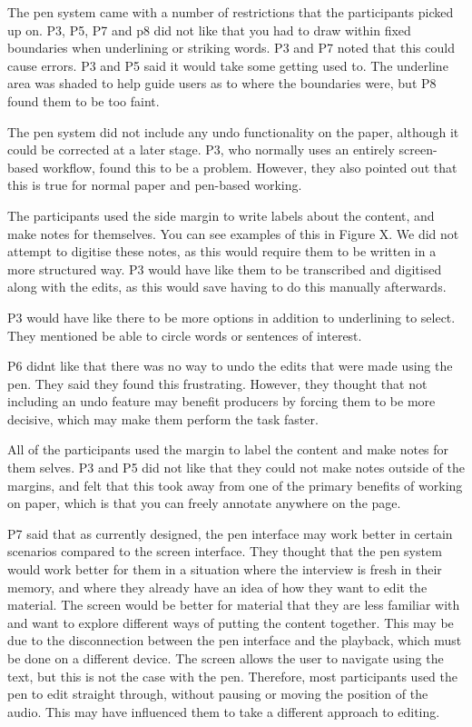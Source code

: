 The pen system came with a number of restrictions that the participants picked up on. P3, P5, P7 and p8 did not like
that you had to draw within fixed boundaries when underlining or striking words. P3 and P7 noted that this could cause
errors. P3 and P5 said it would take some getting used to. The underline area was shaded to help guide users as to
where the boundaries were, but P8 found them to be too faint.

The pen system did not include any undo functionality on the paper, although it could be corrected at a later stage.
P3, who normally uses an entirely screen-based workflow, found this to be a problem. However, they also pointed out
that this is true for normal paper and pen-based working.

The participants used the side margin to write labels about the content, and make notes for themselves. You can see
examples of this in Figure X. We did not attempt to digitise these notes, as this would require them to be written in a
more structured way. P3 would have like them to be transcribed and digitised along with the edits, as this would save
having to do this manually afterwards.

P3 would have like there to be more options in addition to underlining to select. They mentioned be able to circle
words or sentences of interest.

P6 didnt like that there was no way to undo the edits that were made using the pen. They said they found this
frustrating. However, they thought that not including an undo feature may benefit producers by forcing them to be more
decisive, which may make them perform the task faster.

All of the participants used the margin to label the content and make notes for them selves. P3 and P5 did not like
that they could not make notes outside of the margins, and felt that this took away from one of the primary benefits of
working on paper, which is that you can freely annotate anywhere on the page.

P7 said that as currently designed, the pen interface may work better in certain scenarios compared to the screen
interface. They thought that the pen system would work better for them in a situation where the interview is fresh in
their memory, and where they already have an idea of how they want to edit the material. The screen would be better for
material that they are less familiar with and want to explore different ways of putting the content together. This may
be due to the disconnection between the pen interface and the playback, which must be done on a different device. The
screen allows the user to navigate using the text, but this is not the case with the pen. Therefore, most participants
used the pen to edit straight through, without pausing or moving the position of the audio. This may have influenced
them to take a different approach to editing.

